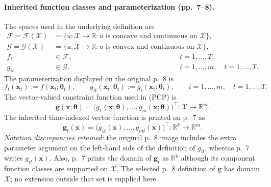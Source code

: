 \documentclass{article}
\begin{document}
\paragraph{Inherited function classes and parameterization (pp.~7--8).}
The spaces used in the underlying definition are
\[
\begin{aligned}
\mathcal{F}=\mathcal{F}(\mathcal{X})
&=\{u:\mathcal{X}\to\mathbb{R}:u\text{ is concave and continuous on }\mathcal{X}\},\\
\mathcal{G}=\mathcal{G}(\mathcal{X})
&=\{u:\mathcal{X}\to\mathbb{R}:u\text{ is convex and continuous on }\mathcal{X}\},\\
f_t&\in\mathcal{F}, &&t=1,\ldots,T,\\
g_{it}&\in\mathcal{G}, &&i=1,\ldots,m,\quad t=1,\ldots,T.
\end{aligned}
\]
The parameterization displayed on the original p.~8 is
\[
f_t(\boldsymbol{x}_t):=f(\boldsymbol{x}_t;\boldsymbol{\theta}_t),
\qquad
g_{it}(\boldsymbol{x}_t;\boldsymbol{\theta}_t):=g_i(\boldsymbol{x}_t;\boldsymbol{\theta}_t),
\qquad i=1,\ldots,m,\quad t=1,\ldots,T.
\]
The vector-valued constraint function used in (PCP) is
\[
\boldsymbol{g}(\boldsymbol{x};\boldsymbol{\theta})
=\bigl(g_1(\boldsymbol{x};\boldsymbol{\theta}),\ldots,
 g_m(\boldsymbol{x};\boldsymbol{\theta})\bigr)^{\top}
:\mathcal{X}\to\mathbb{R}^{m}.
\]
The inherited time-indexed vector function is printed on p.~7 as
\[
\boldsymbol{g}_t(\boldsymbol{x})
=\bigl(g_{1t}(\boldsymbol{x}),\ldots,g_{mt}(\boldsymbol{x})\bigr)^{\top}
:\mathbb{R}^{k}\to\mathbb{R}^{m}.
\]
\emph{Notation discrepancies retained:} the original p.~8 image includes the extra parameter argument on the left-hand side of the definition of $g_{it}$, whereas p.~7 writes $g_{it}(\boldsymbol{x})$. Also, p.~7 prints the domain of $\boldsymbol{g}_t$ as $\mathbb{R}^{k}$ although its component function classes are supported on $\mathcal{X}$. The selected p.~8 definition of $\boldsymbol{g}$ has domain $\mathcal{X}$; no extension outside that set is supplied here.
\end{document}
